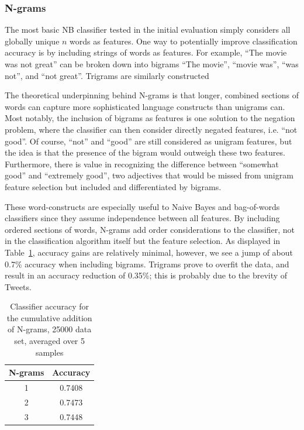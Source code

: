 \documentclass[letter,12pt]{article}
\begin{document}
\subsubsection{N-grams}
\label{ssub:n_grams}

The most basic NB classifier tested in the initial evaluation simply considers
all globally unique $n$ words as features. One way to potentially improve
classification accuracy is by including strings of words as features. For
example, ``The movie was not great'' can be broken down into bigrams ``The
movie'', ``movie was'', ``was not'', and ``not great''. Trigrams are similarly
constructed

The theoretical underpinning behind N-grams is that longer, combined sections
of words can capture more sophisticated language constructs than unigrams can.
Most notably, the inclusion of bigrams as features is one solution to the
negation problem, where the classifier can then consider directly negated
features, i.e. ``not good''. Of course, ``not'' and ``good'' are still
considered as unigram features, but the idea is that the presence of the bigram
would outweigh these two features. Furthermore, there is value in recognizing
the difference between ``somewhat good'' and ``extremely good'', two adjectives
that would be missed from unigram feature selection but included and
differentiated by bigrams.

These word-constructs are especially useful to Naive Bayes and bag-of-words
classifiers since they assume independence between all features. By including
ordered sections of words, N-grams add order considerations to the classifier,
not in the classification algorithm itself but the feature selection. As
displayed in Table~\ref{tab:ngrams}, accuracy gains are relatively minimal,
however, we see a jump of about 0.7\% accuracy when including bigrams. Trigrams
prove to overfit the data, and result in an accuracy reduction of 0.35\%; this
is probably due to the brevity of Tweets.

\begin{table}[h]
\centering
\begin{tabular}{c | c}
  N-grams & Accuracy \\
  \hline
  1 & 0.7408 \\
  2 & 0.7473 \\
  3 & 0.7448
\end{tabular}
\caption{Classifier accuracy for the cumulative addition of N-grams, 25000 data
set, averaged over 5 samples}
\label{tab:ngrams}
\end{table}
\end{document}
